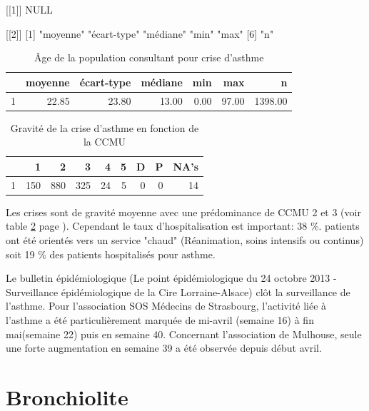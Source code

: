 \documentclass[12pt,english,french,twoside]{book}\usepackage[]{graphicx}\usepackage[]{color}
\begin{document}
[[1]]
NULL

[[2]]
[1] "moyenne"    "écart-type" "médiane"    "min"        "max"       
[6] "n"         

\begin{table}[ht]
\centering
\begin{tabular}{rrrrrrr}
  \hline
 & moyenne & écart-type & médiane & min & max & n \\ 
  \hline
1 & 22.85 & 23.80 & 13.00 & 0.00 & 97.00 & 1398.00 \\ 
   \hline
\end{tabular}
\caption[Asthme et âge]{Âge de la population consultant pour crise d'asthme} 
\label{tab:age_asthme}
\end{table}
\begin{table}[ht]
\centering
\begin{tabular}{rrrrrrrrr}
  \hline
 & 1 & 2 & 3 & 4 & 5 & D & P & NA's \\ 
  \hline
1 & 150 & 880 & 325 &  24 &   5 &   0 &   0 &  14 \\ 
   \hline
\end{tabular}
\caption[Asthme et CCMU]{Gravité de la crise d'asthme en fonction de la CCMU} 
\label{tab:ccmu_asthme}
\end{table}



Les crises sont de gravité moyenne avec une prédominance de CCMU 2 et 3 (voir table \ref{tab:ccmu_asthme} page \pageref{tab:ccmu_asthme}).
Cependant le taux d'hospitalisation est important: 38 \%.
 patients ont été orientés vers un service "chaud" (Réanimation, soins intensifs ou continus) soit 19 \% des patients hospitalisés pour asthme.

Le bulletin épidémiologique (Le point épidémiologique du 24 octobre 2013 - Surveillance épidémiologique de la Cire Lorraine-Alsace) clôt la surveillance de l’asthme. Pour l’association SOS Médecins de Strasbourg, l’activité liée à l’asthme a été particulièrement marquée de mi-avril (semaine 16) à fin mai(semaine 22) puis en semaine 40. Concernant l’association de Mulhouse, seule une forte augmentation en semaine 39 a été observée depuis début avril.

\section{Bronchiolite}
\end{document}
